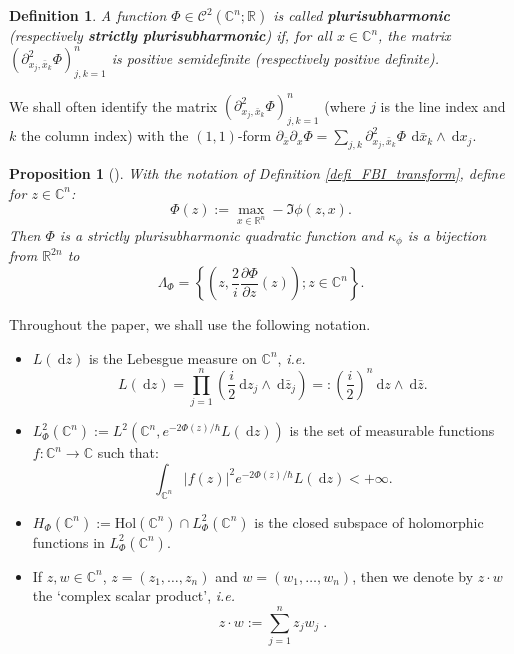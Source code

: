 \documentclass{article}
\newtheorem{prop}[theo]{Proposition}
\newtheorem{defi}[theo]{Definition}
\newcommand{\Hol}{\mathrm{Hol}}
\newcommand{\DD}{\:\!\mathrm{d}}
\newcommand{\CM}{\mathbb{C}}
\begin{document}
\begin{defi} \label{defi_plurisubharmonic_fonctions} A function
  $ \Phi \in \mathscr{C}^2( \CM^n; \mathbb{R})$ is called
  \textbf{plurisubharmonic} (respectively \textbf{strictly
    plurisubharmonic}) if, for all $x \in \CM^n$, the matrix
  $ ( \partial^2_{x_j, \bar{x}_k} \Phi )_{j, k=1}^n$ is positive
  semidefinite (respectively positive definite).
\end{defi}
We shall often identify the matrix
$ ( \partial^2_{x_j, \bar{x}_k} \Phi )_{j, k=1}^n$ (where $j$ is the
line index and $k$ the column index) with the $(1,1)$-form
$\partial_{\bar x}\partial_x \Phi = \sum_{j,k} \partial^2_{x_j,
  \bar{x}_k} \Phi\, \DD \bar x_k \wedge \DD x_j $.
\begin{prop}[\cite{sj-96}]
  With the notation of Definition \ref{defi_FBI_transform}, define for
  $z \in \CM^n$:
  \begin{equation} \label{eq_defi_Phi} \Phi(z) := \max_{x \in
      \mathbb{R}^n} - \Im \phi(z, x) .
  \end{equation}
  Then $\Phi$ is a strictly plurisubharmonic quadratic function and
  $\kappa_{\phi}$ is a bijection from $ \mathbb{R}^{2n}$ to
  \begin{equation}
    \label{equ:Lambda_Phi}
    \Lambda_{ \Phi} = \left\lbrace \left(z, \dfrac{2}{i} \dfrac{\partial
          \Phi}{\partial z}(z) \right); z \in \CM^n
    \right\rbrace.
  \end{equation}
\end{prop}

Throughout the paper, we shall use the following notation.
\begin{itemize}
\item $L(\DD z)$ is the Lebesgue measure on $ \CM^n$, \textit{i.e.}
  \begin{equation}
    \label{equ:lebesgue}
    L(\DD z)= \prod_{j=1}^n \left( 
      \dfrac{i}{2}\DD z_j \wedge\DD \bar{z}_j \right) =: 
    \left( \frac{i}{2} \right)^n\DD z \wedge\DD \bar{z}. 
  \end{equation}
\item
  $L^2_{\Phi}( \CM^n) := L^2( \CM^n, e^{-2 \Phi(z)/ \hbar} L(\DD z))$
  is the set of measurable functions $f:\CM^n\to\CM$ such that:
  \[
  \int_{ \CM^n} |f(z)|^2 e^{-2 \Phi(z)/ \hbar} L(\DD z) < + \infty.
  \]
\item $H_{\Phi}( \CM^n) := \Hol( \CM^n) \cap L^2_{ \Phi}( \CM^n)$ is
  the closed subspace of holomorphic functions in
  $L^2_{\Phi}( \CM^n)$.
\item If $z,w\in\CM^n$, $z=(z_1,\dots,z_n)$ and $w=(w_1,\dots,w_n)$,
  then we denote by $z\cdot w$ the `complex scalar product',
  \emph{i.e.}
  \[
  z \cdot w := \sum_{j=1}^n z_j w_j \; .
  \]
\end{itemize}
\end{document}
